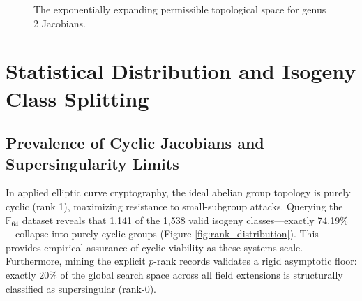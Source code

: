 \documentclass[11pt,letterpaper]{article}
\begin{document}
\begin{figure}[htpb]
\centering
{}
\caption{The exponentially expanding permissible topological space for genus 2 Jacobians.}
\label{fig:hasse_weil_bounds}
\end{figure}

\section{Statistical Distribution and Isogeny Class Splitting}

\subsection{Prevalence of Cyclic Jacobians and Supersingularity Limits}
In applied elliptic curve cryptography, the ideal abelian group topology is purely cyclic (rank 1), maximizing resistance to small-subgroup attacks. Querying the $\mathbb{F}_{64}$ dataset reveals that 1,141 of the 1,538 valid isogeny classes---exactly 74.19\%---collapse into purely cyclic groups (Figure \ref{fig:rank_distribution}). This provides empirical assurance of cyclic viability as these systems scale. Furthermore, mining the explicit $p$-rank records validates a rigid asymptotic floor: exactly 20\% of the global search space across all field extensions is structurally classified as supersingular (rank-0).
\end{document}
